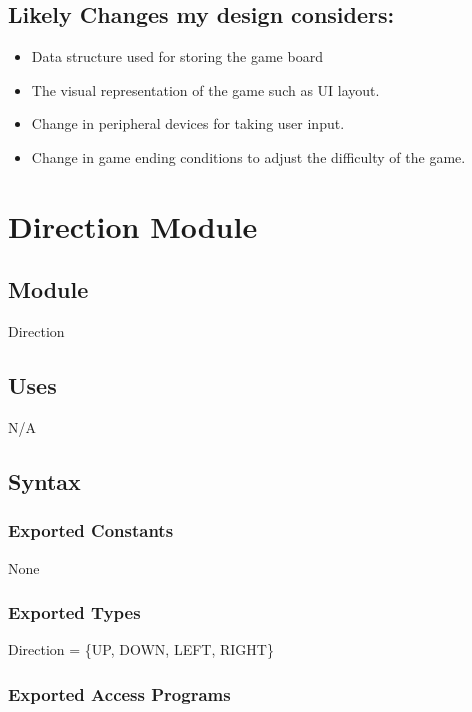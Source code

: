 \documentclass[12pt]{article}
\begin{document}
\subsection*{Likely Changes my design considers:}

\begin{itemize}
  \item Data structure used for storing the game board
  \item The visual representation of the game such as UI layout. 
  \item Change in peripheral devices for taking user input. 
  \item Change in game ending conditions to adjust the difficulty of the game.
\end{itemize}

\newpage

\section* {Direction Module}

\subsection*{Module}

Direction

\subsection* {Uses}

N/A

\subsection* {Syntax}

\subsubsection* {Exported Constants}

None

\subsubsection* {Exported Types}

Direction = \{UP, DOWN, LEFT, RIGHT\}

\medskip

\subsubsection* {Exported Access Programs}
\end{document}
